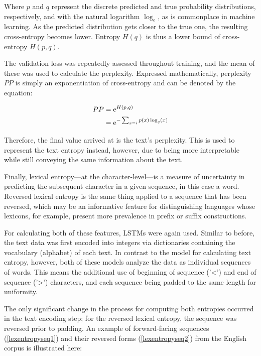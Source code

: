 \documentclass[12pt,a4paper]{article}
\numberwithin{figure}{section}
\numberwithin{table}{section}
\numberwithin{definition}{section}
\begin{document}
Where \( p \) and \( q \) represent the discrete predicted and true probability distributions, respectively, and with the natural logarithm \( \log_e \), as is commonplace in machine learning. As the predicted distribution gets closer to the true one, the resulting cross-entropy becomes lower. Entropy \( H(q) \) is thus a lower bound of cross-entropy \( H(p,q) \). 

The validation loss was repeatedly assessed throughout training, and the mean of these was used to calculate the perplexity. Expressed mathematically, perplexity \( PP \) is simply an exponentiation of cross-entropy and can be denoted by the equation: 

\begin{equation}\label{eq:perplexity}
  \begin{aligned}
    PP &= {\rm e}^{H(p,q)} \\
    &= {\rm e}^{-\sum_{x=i}p(x)\log_q(x)} \\
  \end{aligned}
\end{equation}

Therefore, the final value arrived at is the text's perplexity. This is used to represent the text entropy instead, however, due to being more interpretable while still conveying the same information about the text.

Finally, lexical entropy---at the character-level---is a measure of uncertainty in predicting the subsequent character in a given sequence, in this case a word. Reversed lexical entropy is the same thing applied to a sequence that has been reversed, which may be an informative feature for distinguishing languages whose lexicons, for example, present more prevalence in prefix or suffix constructions. 

For calculating both of these features, LSTMs were again used. Similar to before, the text data was first encoded into integers via dictionaries containing the vocabulary (alphabet) of each text. In contrast to the model for calculating text entropy, however, both of these models analyze the data as individual sequences of words. This means the additional use of beginning of sequence ('<') and end of sequence ('>') characters, and each sequence being padded to the same length for uniformity. 

The only significant change in the process for computing both entropies occurred in the text encoding step; for the reversed lexical entropy, the sequence was reversed prior to padding. An example of forward-facing sequences (\ref{lexentropyseq1}) and their reversed forms (\ref{lexentropyseq2}) from the English corpus is illustrated here:
\end{document}
